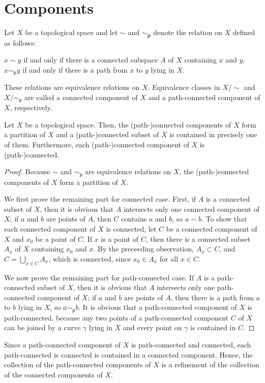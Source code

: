 \section{Components}

\begin{defi}
    Let $X$ be a topological space and let $\sim$ and $\sim_\textbf{p}$ denote the relation on $X$ defined as follows:
    \begin{center}
        $x\sim y$ if and only if there is a connected subspace $A$ of $X$ containing $x$ and $y$,\\
        $x\sim_\textsf{p} y$ if and only if there is a path from $x$ to $y$ lying in $X$.
    \end{center}
    These relations are equivalence relations on $X$.
    Equivalence classes in $X/\sim$ and $X/\sim_\textsf{p}$ are called a connected component of $X$ and a path-connected component of $X$, respectively.
\end{defi}

\begin{prop}
    Let $X$ be a topological space.
    Then, the (path-)connected components of $X$ form a partition of $X$ and a (path-)connected subset of $X$ is contained in precisely one of them.
    Furthermore, each (path-)connected component of $X$ is (path-)connected.
\end{prop}
\begin{proof}
    Because $\sim$ and $\sim_\textsf{p}$ are equivalence relations on $X$, the (path-)connected components of $X$ form a partition of $X$.
    
    We first prove the remaining part for connected case.
    First, if $A$ is a connected subset of $X$, then it is obvious that $A$ intersects only one connected component of $X$; if $a$ and $b$ are points of $A$, then $C$ contains $a$ and $b$, so $a\sim b$.
    To show that each connected component of $X$ is connected, let $C$ be a connected component of $X$ and $x_0$ be a point of $C$.
    If $x$ is a point of $C$, then there is a connected subset $A_x$ of $X$ containing $x_0$ and $x$.
    By the preceeding observation, $A_x\subset C$, and $C=\bigcup_{x\in C} A_x$, which is connected, since $x_0\in A_x$ for all $x\in C$.

    We now prove the remaining part for path-connected case.
    If $A$ is a path-connected subset of $X$, then it is obvious that $A$ intersects only one path-connected component of $X$; if $a$ and $b$ are points of $A$, then there is a path from $a$ to $b$ lying in $X$, so $a\sim_\textsf{p} b$.
    It is obvious that a path-connected component of $X$ is path-connected, because any two points of a path-connected component $C$ of $X$ can be joined by a curve $\gamma$ lying in $X$ and every point on $\gamma$ is contained in $C$.
\end{proof}
\begin{rmk}
    Since a path-connected component of $X$ is path-connected and connected, each path-connected is connected is contained in a connected component.
    Hence, the collection of the path-connected components of $X$ is a refinement of the collection of the connected components of $X$.
\end{rmk}

